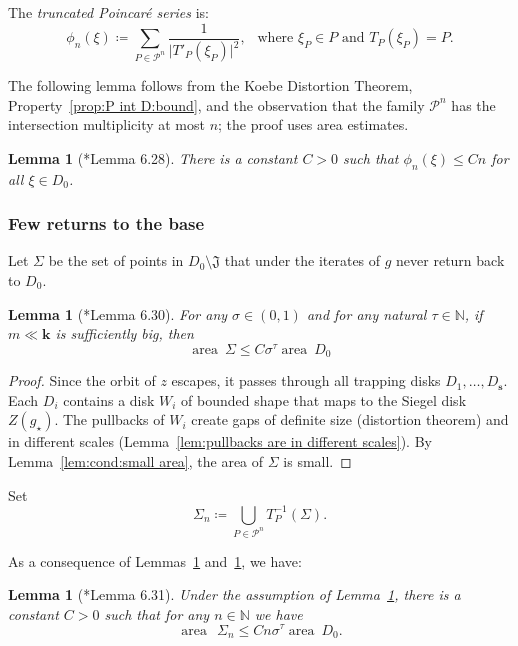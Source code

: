 \documentclass{amsart}
\renewcommand{\sp}{{\ \ }}
\newcommand{\1}{{\mathbb 1 }}
\newcommand\Jul{{\mathfrak J}}
\newcommand{\bbk}{{\mathbf k}}
\newcommand{\bbs}{{\mathbf s}}
\newcommand{\str}{{\star}}
\newcommand\scrP{\mathscr{P}}
\newcommand{\N}{\mathbb{N}}
\newtheorem{lem}[thm]{Lemma}
\theoremstyle{remark}
\numberwithin{equation}{section}
\theoremstyle{definition}
\newcommand{\area}{{\operatorname{area}\ }}
\theoremstyle{nonumberbreak}
\begin{document}
The \emph{truncated Poincar\'e series} is:
\[\phi_n (\xi)\coloneqq\sum _{P\in \scrP^n} \frac{1}{\big|T'_P(\xi_P)\big|^2},\sp \text{ where }\xi_P\in P\text{ and }T_P(\xi_P)=P.\]


The following lemma follows from the Koebe Distortion Theorem, Property~\ref{prop:P int D:bound}, and the observation that  the family $\scrP^n$ has the intersection multiplicity at most $n$; the proof uses area estimates.


\begin{lem}[\cite{AL-posmeas}*{Lemma 6.28}]
\label{lem:phi_n:est}
There is a constant $C>0$ such that ${\phi_n(\xi)\le Cn}$ for all $\xi \in D_0$.
\end{lem}


\subsubsection{Few returns to the base} Let $\Sigma $ be the set of points in $D_0\setminus \Jul$ that under the iterates of $g$
never return back to $D_0$.

\begin{lem}[\cite{AL-posmeas}*{Lemma 6.30}]
\label{lem:Sigma is small}
For any $\sigma\in(0,1)$ and for any natural $\tau\in \N$, if $m\ll\bbk$ is sufficiently big, then 
\[\area \Sigma\le C\sigma^\tau \area D_0 \]
\end{lem}
\begin{proof}
Since the orbit of $z$ escapes, it passes through all trapping disks $D_1,\dots ,D_\bbs$. Each $D_i$ contains a disk $W_i$ of bounded shape that maps to the Siegel disk $Z(g_\str)$. The pullbacks of $W_i$ create gaps of definite size (distortion theorem) and in different scales (Lemma~\ref{lem:pullbacks are in different scales}). By Lemma~\ref{lem:cond:small area}, the area of $\Sigma$ is small.
\end{proof}

Set
\[\Sigma_n \coloneqq \bigcup _{P\in \scrP^n} T_P^{-1}(\Sigma).\]

As a consequence of Lemmas~\ref{lem:Sigma is small} and~\ref{lem:phi_n:est}, we have:
\begin{lem}[\cite{AL-posmeas}*{Lemma 6.31}]
\label{lem:Sigma_n is small}
Under the assumption of Lemma~\ref{lem:Sigma is small}, there is a constant $C>0$  such that for any $n\in \N$ we have
\[\area\ \Sigma_n\le Cn\sigma^\tau \area D_0.\]
\end{lem}
\end{document}
